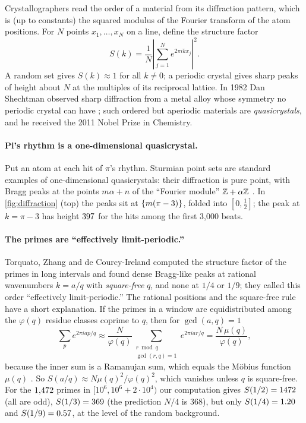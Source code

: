 Crystallographers read the order of a material from its diffraction pattern, which is (up to constants) the squared modulus of the Fourier transform of the atom positions. For $N$ points $x_1, \dots, x_N$ on a line, define the structure factor
\begin{equation}\label{eq:sk}
  S(k) = \frac{1}{N}\left|\sum_{j=1}^N e^{2\pi i k x_j}\right|^2 .
\end{equation}
A random set gives $S(k) \approx 1$ for all $k \ne 0$; a periodic crystal gives sharp peaks of height about $N$ at the multiples of its reciprocal lattice. In 1982 Dan Shechtman observed sharp diffraction from a metal alloy whose symmetry no periodic crystal can have \citep{Shechtman1984}; such ordered but aperiodic materials are \emph{quasicrystals}, and he received the 2011 Nobel Prize in Chemistry.

\paragraph{Pi's rhythm is a one-dimensional quasicrystal.} Put an atom at each hit of $\pi$'s rhythm. Sturmian point sets are standard examples of one-dimensional quasicrystals: their diffraction is pure point, with Bragg peaks at the points $m\alpha + n$ of the ``Fourier module'' $\mathbb{Z} + \alpha\mathbb{Z}$ \citep{BaakeGrimm2013}. In \cref{fig:diffraction} (top) the peaks sit at $\{m(\pi - 3)\}$, folded into $[0, \tfrac12]$; the peak at $k = \pi - 3$ has height $397$ for the hits among the first 3{,}000 beats.

\paragraph{The primes are ``effectively limit-periodic.''} Torquato, Zhang and de Courcy-Ireland \citep{Torquato2018} computed the structure factor of the primes in long intervals and found dense Bragg-like peaks at rational wavenumbers $k = a/q$ with \emph{square-free} $q$, and none at $1/4$ or $1/9$; they called this order ``effectively limit-periodic.'' The rational positions and the square-free rule have a short explanation. If the primes in a window are equidistributed among the $\varphi(q)$ residue classes coprime to $q$, then for $\gcd(a, q) = 1$
\[
  \sum_{p} e^{2\pi i a p/q} \approx \frac{N}{\varphi(q)} \sum_{\substack{r \bmod q\\ \gcd(r,q)=1}} e^{2\pi i a r/q} = \frac{N\,\mu(q)}{\varphi(q)},
\]
because the inner sum is a Ramanujan sum, which equals the Möbius function $\mu(q)$ \citep[\S 16.6]{HardyWright2008}. So $S(a/q) \approx N \mu(q)^2/\varphi(q)^2$, which vanishes unless $q$ is square-free. For the $1{,}472$ primes in $[10^6, 10^6 + 2\cdot 10^4)$ our computation gives $S(1/2) = 1472$ (all are odd), $S(1/3) = 369$ (the prediction $N/4$ is $368$), but only $S(1/4) = 1.20$ and $S(1/9) = 0.57$, at the level of the random background.


